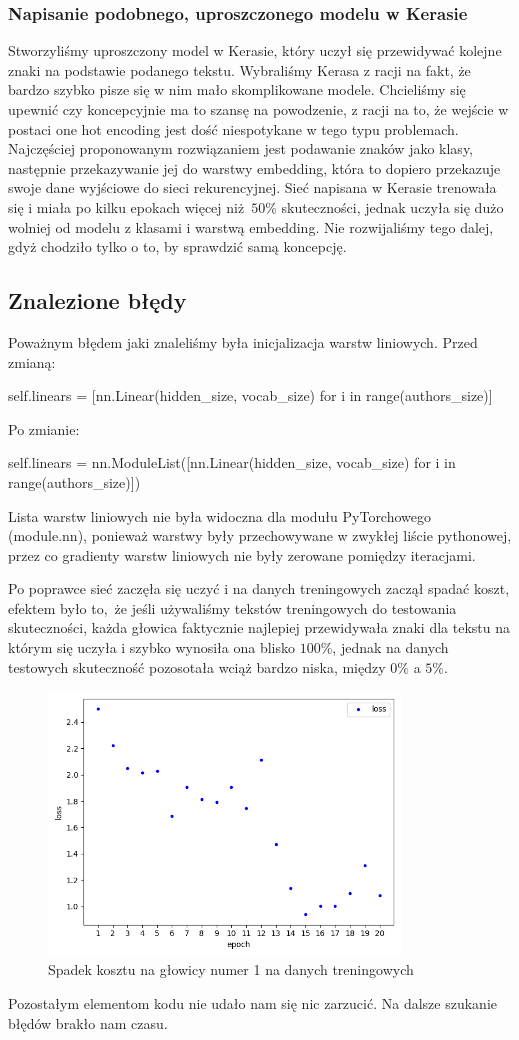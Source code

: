 \subsubsection{Napisanie podobnego, uproszczonego modelu w Kerasie}
Stworzyliśmy uproszczony model w Kerasie, który uczył się przewidywać kolejne znaki na podstawie podanego tekstu. 
Wybraliśmy Kerasa z racji na fakt, że bardzo szybko pisze się w nim mało skomplikowane modele.
Chcieliśmy się upewnić czy koncepcyjnie ma to szansę na powodzenie, z racji na to, że wejście w postaci one hot encoding 
jest dość niespotykane w tego typu problemach. Najczęściej proponowanym rozwiązaniem jest podawanie znaków jako klasy, następnie 
przekazywanie jej do warstwy embedding, która to dopiero przekazuje swoje dane wyjściowe do sieci rekurencyjnej. 
Sieć napisana w Kerasie trenowała się i miała po kilku epokach więcej niż $50\%$ skuteczności, jednak uczyła się
dużo wolniej od modelu z klasami i warstwą embedding. Nie rozwijaliśmy tego dalej, gdyż chodziło tylko o to,
by sprawdzić samą koncepcję.

\newpage
\subsection{Znalezione błędy}
Poważnym błędem jaki znaleliśmy była inicjalizacja warstw liniowych.
Przed zmianą:
\begin{python}
self.linears = [nn.Linear(hidden_size, vocab_size) for i in range(authors_size)]

\end{python} 
Po zmianie:
\begin{python}
self.linears = nn.ModuleList([nn.Linear(hidden_size, vocab_size) for i in range(authors_size)])

\end{python} 

Lista warstw liniowych nie była widoczna dla modułu PyTorchowego (module.nn), ponieważ warstwy były przechowywane
w zwykłej liście pythonowej, przez co gradienty warstw liniowych nie były zerowane pomiędzy iteracjami.

Po poprawce sieć zaczęła się uczyć i na danych treningowych zaczął spadać koszt, efektem było to, że 
jeśli używaliśmy tekstów treningowych do testowania skuteczności, każda głowica faktycznie najlepiej przewidywała
znaki dla tekstu na którym się uczyła i szybko wynosiła ona blisko $100\%$, jednak na danych testowych 
skuteczność pozosotała wciąż bardzo niska, między $0\%$ a $5\%$.

\begin{figure}[H]
	\centering
	\includegraphics[height=7cm]{./images/loss_decrease.png}
	\caption{Spadek kosztu na głowicy numer 1 na danych treningowych}
	\label{fig:test5}
	\end{figure}

Pozostałym elementom kodu nie udało nam się nic zarzucić. Na dalsze szukanie błędów brakło nam czasu.
